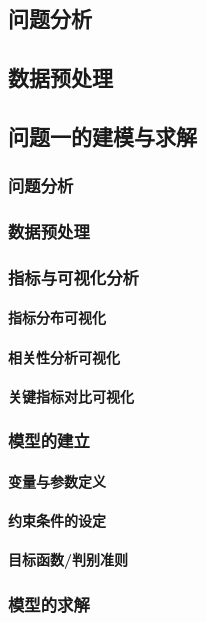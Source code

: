 \documentclass[withoutpreface]{cumcmthesis}
\begin{document}
\subsection{问题分析}
\subsection{数据预处理}

\subsection{问题一的建模与求解}
\subsubsection{问题分析}
\subsubsection{数据预处理}
\subsubsection{指标与可视化分析}
\paragraph{指标分布可视化}
\paragraph{相关性分析可视化}
\paragraph{关键指标对比可视化}
\subsubsection{模型的建立}
\paragraph{变量与参数定义}
\paragraph{约束条件的设定}
\paragraph{目标函数/判别准则}
\subsubsection{模型的求解}
\end{document}
